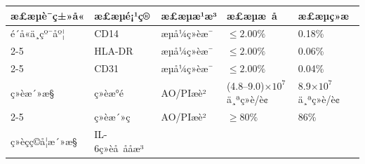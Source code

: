 \documentclass[UTF8,10pt,a4paper,fontset=fandol]{ctexart}
\newcommand{\fieldvalue}[1]{#1}
\begin{document}
\small
\begin{tabularx}{\textwidth}{|p{2.2cm}|p{3.0cm}|p{2.7cm}|X|X|}
\hline
æ£æµè¯ç±»å« & æ£æµé¡¹ç® & æ£æµæ¹æ³ & æ£æµæ å & æ£æµç»æ\\
\hline
\fieldvalue{é´å«ä¸çº¯åº¦}
&
\fieldvalue{CD14}
&
\fieldvalue{æµå¼ç»èæ¯}
&
\fieldvalue{$\leq 2.00\%$}
&
\fieldvalue{0.18\%}
\\ \cline{2-5}
&
\fieldvalue{HLA-DR}
&
\fieldvalue{æµå¼ç»èæ¯}
&
\fieldvalue{$\leq 2.00\%$}
&
\fieldvalue{0.06\%}
\\ \cline{2-5}
&
\fieldvalue{CD31}
&
\fieldvalue{æµå¼ç»èæ¯}
&
\fieldvalue{$\leq 2.00\%$}
&
\fieldvalue{0.04\%}
\\ \hline
\fieldvalue{ç»èæ´»æ§}
&
\fieldvalue{ç»èæ°é}
&
\fieldvalue{AO/PIæè²}
&
\fieldvalue{(4.8--9.0)$\times 10^{7}$ä¸ªç»è/è¢}
&
\fieldvalue{8.9$\times 10^{7}$ä¸ªç»è/è¢}
\\ \cline{2-5}
&
\fieldvalue{ç»èæ´»ç}
&
\fieldvalue{AO/PIæè²}
&
\fieldvalue{$\geq 80\%$}
&
\fieldvalue{86\%}
\\ \hline
\fieldvalue{ç»èçç©å­¦æ´»æ§}
&
\fieldvalue{IL-6ç»èå å­åæ³}
&

\end{tabularx}
\end{document}
